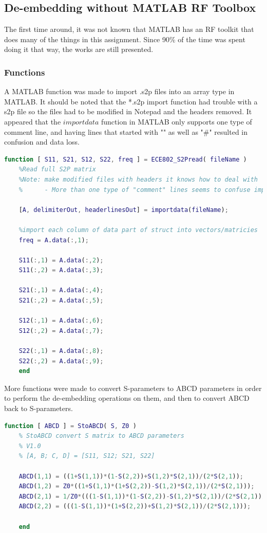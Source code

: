 \documentclass{article} %
\begin{document}
	\subsection{De-embedding without MATLAB RF Toolbox} 
	The first time around, it was not known that MATLAB has an RF toolkit that does many of the things in this assignment.  Since 90\% of the time was spent doing it that way, the works are still presented. 
	\subsubsection{Functions}
	A MATLAB function was made to import .s2p files into an array type in MATLAB. It should be noted that the *.s2p import function had trouble with a s2p file so the files had to be modified in Notepad and the headers removed.  It appeared that the $importdata$ function in MATLAB only supports one type of comment line, and having lines that started with "\!" as well as "\#" resulted in confusion and data loss.
	
	\begin{lstlisting}[language=Matlab, caption=*.s2p Import]
	function [ S11, S21, S12, S22, freq ] = ECE802_S2Pread( fileName )
	%Read full S2P matrix
	%Note: make modified files with headers it knows how to deal with
	%      - More than one type of "comment" lines seems to confuse importdata
	
	[A, delimiterOut, headerlinesOut] = importdata(fileName);
	
	%import each column of data part of struct into vectors/matricies
	freq = A.data(:,1);
	
	S11(:,1) = A.data(:,2);
	S11(:,2) = A.data(:,3);
	
	S21(:,1) = A.data(:,4);
	S21(:,2) = A.data(:,5);
	
	S12(:,1) = A.data(:,6);
	S12(:,2) = A.data(:,7);
	
	S22(:,1) = A.data(:,8);
	S22(:,2) = A.data(:,9);
	end
	\end{lstlisting}
	
	More functions were made to convert S-parameters to ABCD parameters in order to perform the de-embedding operations on them, and then to convert ABCD back to S-parameters.
	
	\begin{lstlisting}[language=Matlab, caption=S-parameters to ABCD]
	function [ ABCD ] = StoABCD( S, Z0 )
	% StoABCD convert S matrix to ABCD parameters
	% V1.0
	% [A, B; C, D] = [S11, S12; S21, S22]
	
	ABCD(1,1) = ((1+S(1,1))*(1-S(2,2))+S(1,2)*S(2,1))/(2*S(2,1));
	ABCD(1,2) = Z0*((1+S(1,1)*(1+S(2,2))-S(1,2)*S(2,1))/(2*S(2,1)));
	ABCD(2,1) = 1/Z0*(((1-S(1,1))*(1-S(2,2))-S(1,2)*S(2,1))/(2*S(2,1)));
	ABCD(2,2) = (((1-S(1,1))*(1+S(2,2))+S(1,2)*S(2,1))/(2*S(2,1)));
	
	end
	\end{lstlisting}
	
\end{document}
